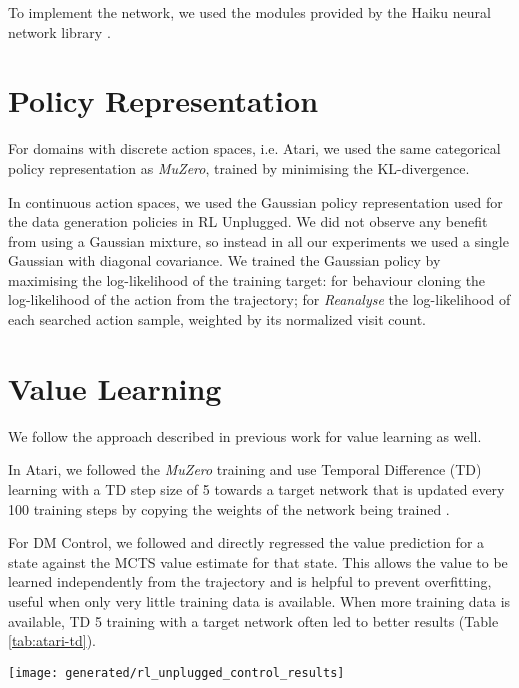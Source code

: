 \documentclass{article}
\newcommand{\muzero}{\emph{MuZero}}
\newcommand{\reanalyse}{\emph{Reanalyse}}
\newcommand{\mzunplugged}{\emph{MuZero Unplugged}}
\begin{document}
To implement the network, we used the modules provided by the Haiku neural network library \cite{haiku2020github}.

\section{Policy Representation}

For domains with discrete action spaces, i.e. Atari, we used the same categorical policy representation as \muzero{}, trained by minimising the KL-divergence.

In continuous action spaces, we used the Gaussian policy representation used for the data generation policies in RL Unplugged. We did not observe any benefit from using a Gaussian mixture, so instead in all our experiments we used a single Gaussian with diagonal covariance. We trained the Gaussian policy by maximising the log-likelihood of the training target: for behaviour cloning the log-likelihood of the action from the trajectory; for \reanalyse{} the log-likelihood of each searched action sample, weighted by its normalized visit count.

\section{Value Learning}

We follow the approach described in previous work for value learning as well.

In Atari, we followed the \muzero{} training and use Temporal Difference (TD) learning with a TD step size of 5 towards a target network that is updated every 100 training steps by copying the weights of the network being trained \cite{muzero}.

For DM Control, we followed \cite{muzero_sampled} and directly regressed the value prediction for a state against the MCTS value estimate for that state. This allows the value to be learned independently from the trajectory and is helpful to prevent overfitting, useful when only very little training data is available. When more training data is available, TD 5 training with a target network often led to better results (Table \ref{tab:atari-td}).

\begin{figure*}
\texttt{[image: generated/rl\_unplugged\_control\_results]}
\vspace*{-7mm}
\caption[]{
\label{fig:rl-unplugged-control-plots}
\textbf{Performance throughout training in RL Unplugged Control Suite.} The x-axis shows thousands of training batches, the y-axis mean reward. Performance of \mzunplugged{} was better than Behaviour Cloning (BC) throughout training. For some tasks with a small dataset such as cartpole, walker or finger.turn\_hard, \mzunplugged{} performance peaked at the beginning of training and subsequently declined due to overfitting.
}
\end{figure*}
\end{document}
